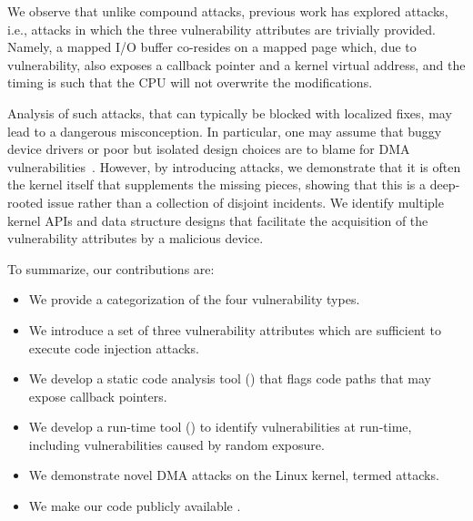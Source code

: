 We observe that unlike compound attacks, previous work has explored \simple{} attacks, i.e., attacks in which the three vulnerability attributes are trivially provided. 
Namely, a mapped I/O buffer co-resides on a mapped page which, due to \subpage{} vulnerability, also exposes a callback pointer and a kernel virtual address, and the timing is such that the CPU will not overwrite the modifications.

Analysis of such \simple{} attacks, that can typically be blocked with localized fixes, may lead to a dangerous misconception. In particular, one may assume that buggy device drivers or poor but isolated design choices are to blame for DMA vulnerabilities~\cite{malka2015efficient,malka2015riommu}.
However, by introducing \compound attacks, we demonstrate that it is often the kernel itself that supplements the missing pieces, showing that this is a deep-rooted issue rather than a collection of disjoint incidents.
We identify multiple kernel APIs and data structure designs that facilitate the acquisition of the vulnerability attributes by a malicious device.


To summarize, our contributions are:
\begin{itemize}
    \item We provide a categorization of the four \subpage{} vulnerability types.
    \item We introduce a set of three vulnerability attributes which are sufficient to execute code injection attacks.
    \item We develop a static code analysis tool (\tool) that flags code paths that may expose callback pointers. 
    \item We develop a run-time tool (\dkasan) to identify \subpage{} vulnerabilities at run-time, including vulnerabilities caused by random exposure.
    \item We demonstrate novel DMA attacks on the Linux kernel, termed \compound{} attacks.
    \item We make our code publicly available \cite{DKASAN,SPADE}.
\end{itemize}


